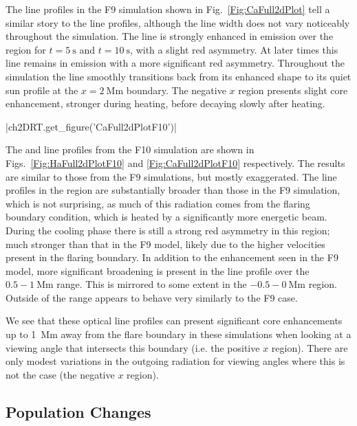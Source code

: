 The \CaLine{} line profiles in the F9 simulation shown in Fig.~\ref{Fig:CaFull2dPlot} tell a similar story to the \Ha{} line profiles, although the line width does not vary noticeably throughout the simulation.
The line is strongly enhanced in emission over the \regiona{} region for $t=\SI{5}{\second}$ and $t=\SI{10}{\second}$, with a slight red asymmetry.
At later times this line remains in emission with a more significant red asymmetry.
Throughout the simulation the line smoothly transitions back from its enhanced shape to its quiet sun profile at the $x=\SI{2}{\mega\metre}$ boundary.
The negative $x$ region presents slight core enhancement, stronger during heating, before decaying slowly after heating.

\py[2DRT]|ch2DRT.get_figure('CaFull2dPlotF10')|

The \Ha{} and \CaLine{} line profiles from the F10 simulation are shown in Figs.~\ref{Fig:HaFull2dPlotF10} and \ref{Fig:CaFull2dPlotF10} respectively.
The results are similar to those from the F9 simulations, but mostly exaggerated.
The line profiles in the \regiona{} region are substantially broader than those in the F9 simulation, which is not surprising, as much of this radiation comes from the flaring boundary condition, which is heated by a significantly more energetic beam.
During the cooling phase there is still a strong red asymmetry in this region; much stronger than that in the F9 model, likely due to the higher velocities present in the flaring boundary.
In addition to the enhancement seen in the F9 model, more significant broadening is present in the \Ha{} line profile over the $0.5-\SI{1}{\mega\metre}$ range.
This is mirrored to some extent in the $-0.5 - \SI{0}{\mega\metre}$ region.
Outside of the \regiona{} range \CaLine{} appears to behave very similarly to the F9 case.

We see that these optical line profiles can present significant core enhancements up to \SI{1}{\mega\metre} away from the flare boundary in these simulations when looking at a viewing angle that intersects this boundary (i.e. the positive $x$ region).
There are only modest variations in the outgoing radiation for viewing angles where this is not the case (the negative $x$ region).

\subsection{Population Changes}

